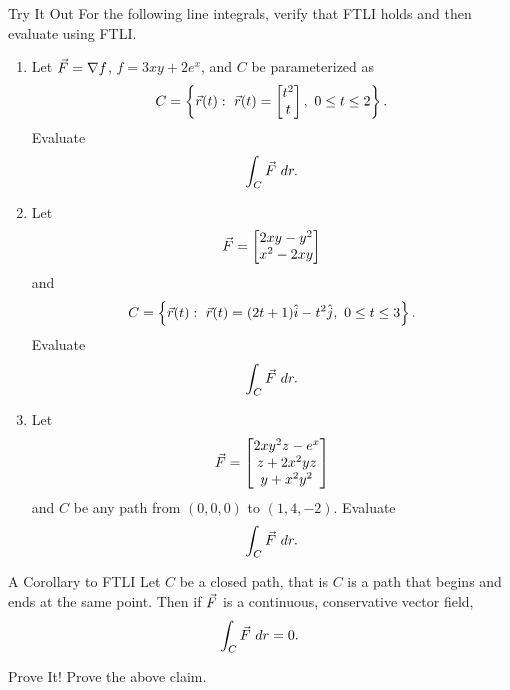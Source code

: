 \begin{exercise}{Try It Out}
For the following line integrals, verify that FTLI holds and then evaluate using FTLI.
\vspace{1em}
\begin{enumerate}
\item Let $\vec{F}=\nabla f$, $f=3xy+2e^x$, and $C$ be parameterized as $$C=\left\{\vcr(t):\ \vcr(t)=\bmat{t^2\\t},\ 0\leq t\leq 2 \right\}. $$ Evaluate $$\int_C\vec{F}\ dr.$$
\item Let $$\vec{F}=\begin{bmatrix}2xy-y^2\\x^2-2xy\end{bmatrix} $$ and $$C=\left\{\vcr(t):\ \vcr(t)=(2t+1)\vci-t^2\vcj,\ 0\leq t\leq 3  \right\}.$$ Evaluate $$\int_C \vec{F} \ dr.$$
\item Let $$\vec{F}=\begin{bmatrix}2xy^2z-e^x\\z+2x^2yz\\y+x^2y^2\end{bmatrix} $$ and $C$ be any path from $(0,0,0)$ to $(1, 4, -2)$. Evaluate $$\int_C \vec{F}\ dr. $$
\end{enumerate}

\end{exercise}

\begin{claim}{A Corollary to FTLI}
Let $C$ be a closed path, that is $C$ is a path that begins and ends at the same point. Then if $\vec{F}$ is a continuous, conservative vector field, $$\int_C \vec{F} \ dr=0. $$
\end{claim}

\begin{exercise}{Prove It!}
Prove the above claim.
\end{exercise}